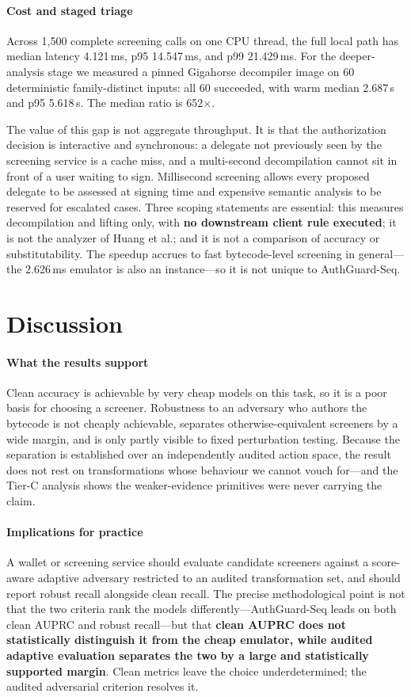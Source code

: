 \documentclass[conference]{IEEEtran}
\begin{document}
\paragraph*{Cost and staged triage} Across 1,500 complete screening calls on one CPU thread, the full local path has median latency 4.121\,ms, p95 14.547\,ms, and p99 21.429\,ms. For the deeper-analysis stage we measured a pinned Gigahorse decompiler image on 60 deterministic family-distinct inputs: all 60 succeeded, with warm median 2.687\,s and p95 5.618\,s. The median ratio is 652$\times$.

The value of this gap is not aggregate throughput. It is that the authorization decision is interactive and synchronous: a delegate not previously seen by the screening service is a cache miss, and a multi-second decompilation cannot sit in front of a user waiting to sign. Millisecond screening allows every proposed delegate to be assessed at signing time and expensive semantic analysis to be reserved for escalated cases. Three scoping statements are essential: this measures decompilation and lifting only, with \textbf{no downstream client rule executed}; it is not the analyzer of Huang et al.; and it is not a comparison of accuracy or substitutability. The speedup accrues to fast bytecode-level screening in general---the 2.626\,ms emulator is also an instance---so it is not unique to AuthGuard-Seq.

\section{Discussion}
\label{sec:discussion}

\paragraph*{What the results support} Clean accuracy is achievable by very cheap models on this task, so it is a poor basis for choosing a screener. Robustness to an adversary who authors the bytecode is not cheaply achievable, separates otherwise-equivalent screeners by a wide margin, and is only partly visible to fixed perturbation testing. Because the separation is established over an independently audited action space, the result does not rest on transformations whose behaviour we cannot vouch for---and the Tier-C analysis shows the weaker-evidence primitives were never carrying the claim.

\paragraph*{Implications for practice} A wallet or screening service should evaluate candidate screeners against a score-aware adaptive adversary restricted to an audited transformation set, and should report robust recall alongside clean recall. The precise methodological point is not that the two criteria rank the models differently---AuthGuard-Seq leads on both clean AUPRC and robust recall---but that \textbf{clean AUPRC does not statistically distinguish it from the cheap emulator, while audited adaptive evaluation separates the two by a large and statistically supported margin}. Clean metrics leave the choice underdetermined; the audited adversarial criterion resolves it.
\end{document}
